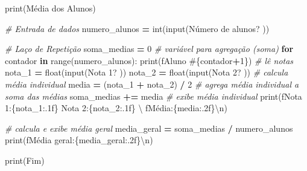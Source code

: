 \documentclass[
]{book}
\newenvironment{Shaded}{\begin{snugshade}}{\end{snugshade}}
\newcommand{\BuiltInTok}[1]{#1}
\newcommand{\CharTok}[1]{\textcolor[rgb]{0.31,0.60,0.02}{#1}}
\newcommand{\CommentTok}[1]{\textcolor[rgb]{0.56,0.35,0.01}{\textit{#1}}}
\newcommand{\ControlFlowTok}[1]{\textcolor[rgb]{0.13,0.29,0.53}{\textbf{#1}}}
\newcommand{\DecValTok}[1]{\textcolor[rgb]{0.00,0.00,0.81}{#1}}
\newcommand{\KeywordTok}[1]{\textcolor[rgb]{0.13,0.29,0.53}{\textbf{#1}}}
\newcommand{\NormalTok}[1]{#1}
\newcommand{\OperatorTok}[1]{\textcolor[rgb]{0.81,0.36,0.00}{\textbf{#1}}}
\newcommand{\SpecialCharTok}[1]{\textcolor[rgb]{0.00,0.00,0.00}{#1}}
\newcommand{\SpecialStringTok}[1]{\textcolor[rgb]{0.31,0.60,0.02}{#1}}
\newcommand{\StringTok}[1]{\textcolor[rgb]{0.31,0.60,0.02}{#1}}
\begin{document}
\begin{Shaded}
\begin{Highlighting}[]
\BuiltInTok{print}\NormalTok{(}\StringTok{\textquotesingle{}Média dos Alunos\textquotesingle{}}\NormalTok{)}

\CommentTok{\# Entrada de dados}
\NormalTok{numero\_alunos }\OperatorTok{=} \BuiltInTok{int}\NormalTok{(}\BuiltInTok{input}\NormalTok{(}\StringTok{\textquotesingle{}Número de alunos? \textquotesingle{}}\NormalTok{))}

\CommentTok{\# Laço de Repetição}
\NormalTok{soma\_medias }\OperatorTok{=} \DecValTok{0} \CommentTok{\# variável para agregação (soma)}
\ControlFlowTok{for}\NormalTok{ contador }\KeywordTok{in} \BuiltInTok{range}\NormalTok{(numero\_alunos):}
    \BuiltInTok{print}\NormalTok{(}\SpecialStringTok{f\textquotesingle{}Aluno \#}\SpecialCharTok{\{}\NormalTok{contador}\OperatorTok{+}\DecValTok{1}\SpecialCharTok{\}}\SpecialStringTok{\textquotesingle{}}\NormalTok{)}
    \CommentTok{\# lê notas}
\NormalTok{    nota\_1 }\OperatorTok{=} \BuiltInTok{float}\NormalTok{(}\BuiltInTok{input}\NormalTok{(}\StringTok{\textquotesingle{}Nota 1? \textquotesingle{}}\NormalTok{))}
\NormalTok{    nota\_2 }\OperatorTok{=} \BuiltInTok{float}\NormalTok{(}\BuiltInTok{input}\NormalTok{(}\StringTok{\textquotesingle{}Nota 2? \textquotesingle{}}\NormalTok{))}
    \CommentTok{\# calcula média individual}
\NormalTok{    media }\OperatorTok{=}\NormalTok{ (nota\_1 }\OperatorTok{+}\NormalTok{ nota\_2) }\OperatorTok{/} \DecValTok{2}
    \CommentTok{\# agrega média individual a soma das médias}
\NormalTok{    soma\_medias }\OperatorTok{+=}\NormalTok{ media}
    \CommentTok{\# exibe média individual}
    \BuiltInTok{print}\NormalTok{(}\SpecialStringTok{f\textquotesingle{}Nota 1:}\SpecialCharTok{\{}\NormalTok{nota\_1}\SpecialCharTok{:.1f\}}\SpecialStringTok{  Nota 2:}\SpecialCharTok{\{}\NormalTok{nota\_2}\SpecialCharTok{:.1f\}}\SpecialStringTok{  \textquotesingle{}}\NormalTok{ \textbackslash{}}
        \SpecialStringTok{f\textquotesingle{}Média:}\SpecialCharTok{\{}\NormalTok{media}\SpecialCharTok{:.2f\}}\CharTok{\textbackslash{}n}\SpecialStringTok{\textquotesingle{}}\NormalTok{)}

\CommentTok{\# calcula e exibe média geral}
\NormalTok{media\_geral }\OperatorTok{=}\NormalTok{ soma\_medias }\OperatorTok{/}\NormalTok{ numero\_alunos}
\BuiltInTok{print}\NormalTok{(}\SpecialStringTok{f\textquotesingle{}Média geral:}\SpecialCharTok{\{}\NormalTok{media\_geral}\SpecialCharTok{:.2f\}}\CharTok{\textbackslash{}n}\SpecialStringTok{\textquotesingle{}}\NormalTok{)}

\BuiltInTok{print}\NormalTok{(}\StringTok{\textquotesingle{}Fim\textquotesingle{}}\NormalTok{)}
\end{Highlighting}
\end{Shaded}
\end{document}
